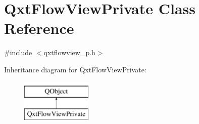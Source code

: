 \hypertarget{class_qxt_flow_view_private}{\section{Qxt\-Flow\-View\-Private Class Reference}
\label{class_qxt_flow_view_private}
}


{\ttfamily \#include $<$qxtflowview\-\_\-p.\-h$>$}

Inheritance diagram for Qxt\-Flow\-View\-Private\-:\begin{figure}[H]
\begin{center}
\leavevmode
\includegraphics[height=2.000000cm]{class_qxt_flow_view_private}
\end{center}
\end{figure}
